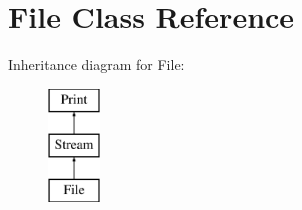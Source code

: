 \hypertarget{class_file}{\section{File Class Reference}
\label{class_file}
}
Inheritance diagram for File\-:\begin{figure}[H]
\begin{center}
\leavevmode
\includegraphics[height=3.000000cm]{class_file}
\end{center}
\end{figure}
